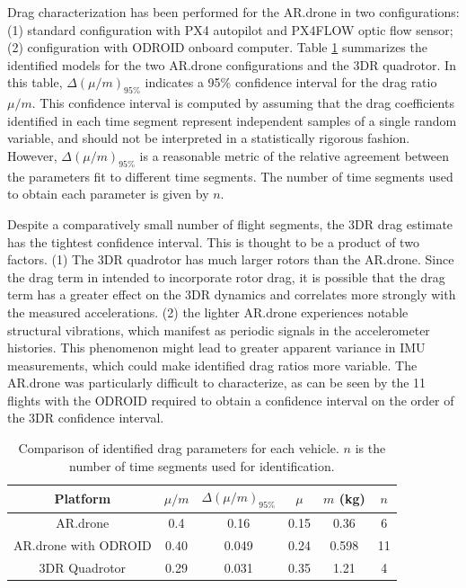 \documentclass{article}
\begin{document}
Drag characterization has been performed for the AR.drone in two configurations: (1) standard configuration with PX4 autopilot and PX4FLOW optic flow sensor; (2) configuration with ODROID onboard computer. Table \ref{tab:nomDrag} summarizes the identified models for the two AR.drone configurations and the 3DR quadrotor. In this table, $\Delta(\mu/m)_{95\%}$ indicates a 95\% confidence interval for the drag ratio $\mu/m$. This confidence interval is computed by assuming that the drag coefficients identified in each time segment represent independent samples of a single random variable, and should not be interpreted in a statistically rigorous fashion. However, $\Delta(\mu/m)_{95\%}$ is a reasonable metric of the relative agreement between the parameters fit to different time segments. The number of time segments used to obtain each parameter is given by $n$.

Despite a comparatively small number of flight segments, the 3DR drag estimate has the tightest confidence interval. This is thought to be a product of two factors. (1) The 3DR quadrotor has much larger rotors than the AR.drone. Since the drag term in intended to incorporate rotor drag, it is possible that the drag term has a greater effect on the 3DR dynamics and correlates more strongly with the measured accelerations. (2) the lighter AR.drone experiences notable structural vibrations, which manifest as periodic signals in the accelerometer histories. This phenomenon might lead to greater apparent variance in IMU measurements, which could make identified drag ratios more variable. The AR.drone was particularly difficult to characterize, as can be seen by the 11 flights with the ODROID required to obtain a confidence interval on the order of the 3DR confidence interval.

\begin{table}[tb!]
\centering
\begin{tabular}{|c|c|c|c|c|c|}
\hline
Platform & $\mu/m$ & $\Delta(\mu/m)_{95\%}$ & $\mu$ & $m$ (kg) & $n$ \\
\hline
AR.drone & 0.4 & 0.16 & 0.15 & 0.36 & 6\\
\hline
AR.drone with ODROID & 0.40 & 0.049 & 0.24 & 0.598 & 11\\
\hline
3DR Quadrotor & 0.29 & 0.031 & 0.35 & 1.21 & 4 \\
\hline
\end{tabular}
\caption{Comparison of identified drag parameters for each vehicle. $n$ is the number of time segments used for identification.}
\label{tab:nomDrag}
\end{table}
\end{document}
